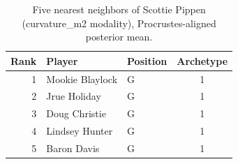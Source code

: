 \begin{table}[htbp]
  \centering\small
  \begin{tabular}{rllc}
    \toprule
    Rank & Player & Position & Archetype \\
    \midrule
    1 & Mookie Blaylock & G & 1 \\
    2 & Jrue Holiday & G & 1 \\
    3 & Doug Christie & G & 1 \\
    4 & Lindsey Hunter & G & 1 \\
    5 & Baron Davis & G & 1 \\
    \bottomrule
  \end{tabular}
  \caption{Five nearest neighbors of Scottie Pippen (curvature_m2 modality), Procrustes-aligned posterior mean.}
  \label{tab:Scottie_Pippen_neighbors_curvature_m2}
\end{table}

